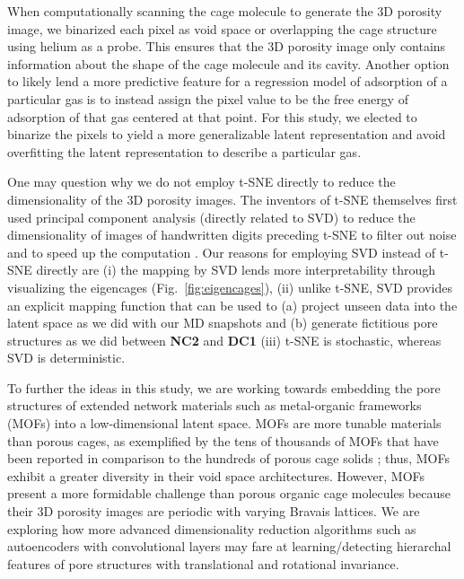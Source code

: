\documentclass[journal=jacsat,manuscript=article,layout=traditional]{achemso}
\begin{document}
{\color{red} When computationally scanning the cage molecule to generate the 3D porosity image, we binarized each pixel as void space or overlapping the cage structure using helium as a probe. This ensures that the 3D porosity image only contains information about the shape of the cage molecule and its cavity. Another option to likely lend a more predictive feature for a regression model of adsorption of a particular gas is to instead assign the pixel value to be the free energy of adsorption of that gas centered at that point. For this study, we elected to binarize the pixels to yield a more generalizable latent representation and avoid overfitting the latent representation to describe a particular gas.}

{\color{red} One may question why we do not employ t-SNE \cite{maaten2008visualizing} directly to reduce the dimensionality of the 3D porosity images. The inventors of t-SNE themselves first used principal component analysis (directly related to SVD) to reduce the dimensionality of images of handwritten digits preceding t-SNE to filter out noise and to speed up the computation \cite{maaten2008visualizing}. Our reasons for employing SVD instead of t-SNE directly are (i) the mapping by SVD lends more interpretability through visualizing the eigencages (Fig.~\ref{fig:eigencages}), (ii) unlike t-SNE, SVD provides an explicit mapping function that can be used to (a) project unseen data into the latent space as we did with our MD snapshots and (b) generate fictitious pore structures as we did between \textbf{NC2} and \textbf{DC1} (iii) t-SNE is stochastic, whereas SVD is deterministic. 
}

To further the ideas in this study, we are working towards embedding the pore structures of extended network materials such as metal-organic frameworks (MOFs) into a low-dimensional latent space. MOFs are more tunable materials than porous cages, as exemplified by the tens of thousands of MOFs that have been reported \cite{moghadam2017development} in comparison to the hundreds of porous cage solids \cite{evans2016computational}; thus, MOFs exhibit a greater diversity in their void space architectures. However, MOFs present a more formidable challenge than porous organic cage molecules because their 3D porosity images are periodic with varying Bravais lattices. We are exploring how more advanced dimensionality reduction algorithms such as autoencoders \cite{hinton2006reducing} with convolutional layers \cite{kavukcuoglu2010learning,zeiler2010deconvolutional} may fare at learning/detecting hierarchal features of pore structures with translational and rotational invariance.
\end{document}
